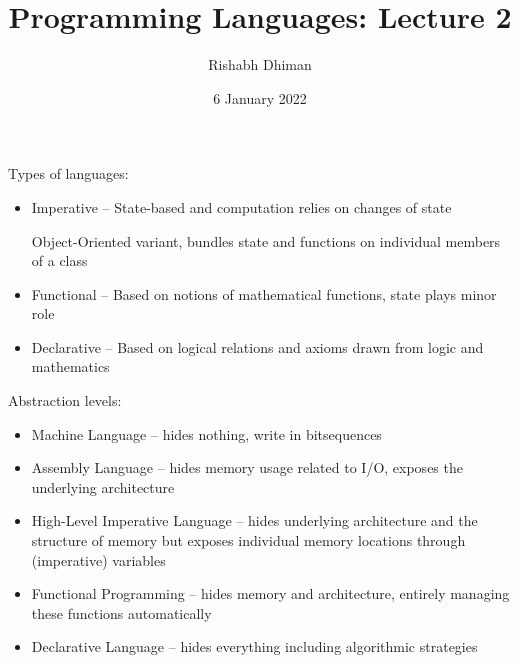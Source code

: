 \documentclass[a4paper]{scrartcl}
\title{Programming Languages: Lecture 2}
\author{Rishabh Dhiman}
\date{6 January 2022}
\begin{document}
\maketitle

Types of languages:
\begin{itemize}
	\item Imperative -- State-based and computation relies on changes of state

		Object-Oriented variant, bundles state and functions on individual members of a class
	\item Functional -- Based on notions of mathematical functions, state plays minor role
	\item Declarative -- Based on logical relations and axioms drawn from logic and mathematics
\end{itemize}

Abstraction levels:
\begin{itemize}
	\item Machine Language -- hides nothing, write in bitsequences
	\item Assembly Language -- hides memory usage related to I/O, exposes the underlying architecture
	\item High-Level Imperative Language -- hides underlying architecture and the structure of memory but exposes individual memory locations through (imperative) variables
	\item Functional Programming -- hides memory and architecture, entirely managing these functions automatically
	\item Declarative Language -- hides everything including algorithmic strategies
\end{itemize}
\end{document}
